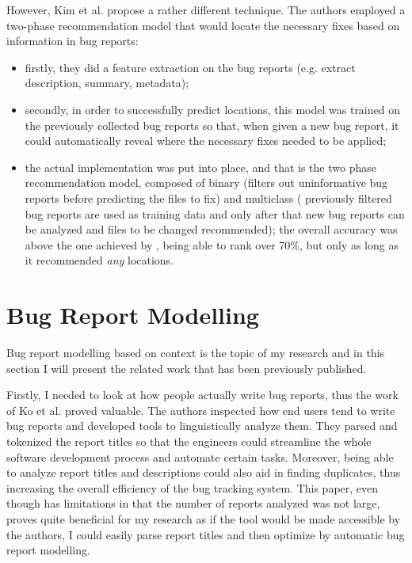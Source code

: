 \documentclass[11pt,english,twocolumn]{article}
\begin{document}
However, Kim et al. \cite{kim2013should} propose a rather different technique.
The authors employed a two-phase recommendation model that would locate the 
necessary fixes based on information in bug reports:
  \begin{itemize}
    \item firstly, they did a feature extraction on the bug reports (e.g. 
    extract description, summary, metadata);
    \item secondly, in order to successfully predict
    locations, this model was trained on the previously collected bug reports so that,
    when given a new bug report, it could automatically reveal where the necessary fixes
    needed to be applied;
    \item the actual implementation was put into place, and that
    is the two phase recommendation model, composed of binary (filters out 
    uninformative bug reports before predicting the files to fix) and multiclass (
    previously filtered bug reports are used as training data and only after that
    new bug reports can be analyzed and files to be changed recommended); the 
    overall accuracy was above the one achieved by \cite{bettenburg2012using}, 
    being able to rank over 70\%, but only as long as it recommended \emph{any} 
    locations.
  \end{itemize}

\section{Bug Report Modelling}
\label{sec:bug-report}

Bug report modelling based on context is the topic of my research and in this
section I will present the related work that has been previously published.

Firstly, I needed to look at how people actually write bug reports,
thus the work of Ko et al. \cite{ko2006linguistic} proved valuable. The
authors inspected how end users tend to write bug reports and developed 
tools to linguistically analyze them. They parsed and tokenized the report
titles so that the engineers could streamline the whole software development
process and automate certain tasks. Moreover, being able to analyze
report titles and descriptions could also aid in finding duplicates, thus
increasing the overall efficiency of the bug tracking system. This paper,
even though has limitations in that the number of reports analyzed was
not large, proves quite beneficial for my research as if the tool would
be made accessible by the authors, I could easily parse report titles
and then optimize by automatic bug report modelling.
\end{document}
